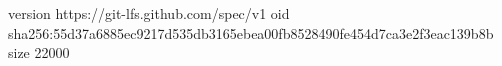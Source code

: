 version https://git-lfs.github.com/spec/v1
oid sha256:55d37a6885ec9217d535db3165ebea00fb8528490fe454d7ca3e2f3eac139b8b
size 22000
